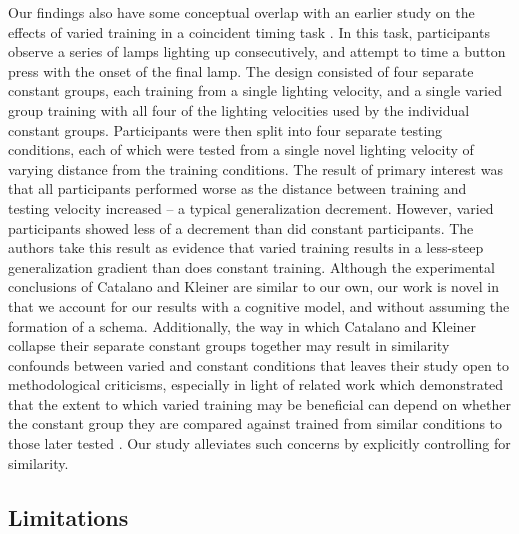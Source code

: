 \documentclass[
  12pt,
  letterpaper,
]{article}
\begin{document}
Our findings also have some conceptual overlap with an earlier study on
the effects of varied training in a coincident timing task
\autocite{catalanoDistantTransferCoincident1984a}. In this task,
participants observe a series of lamps lighting up consecutively, and
attempt to time a button press with the onset of the final lamp. The
design consisted of four separate constant groups, each training from a
single lighting velocity, and a single varied group training with all
four of the lighting velocities used by the individual constant groups.
Participants were then split into four separate testing conditions, each
of which were tested from a single novel lighting velocity of varying
distance from the training conditions. The result of primary interest
was that all participants performed worse as the distance between
training and testing velocity increased -- a typical generalization
decrement. However, varied participants showed less of a decrement than
did constant participants. The authors take this result as evidence that
varied training results in a less-steep generalization gradient than
does constant training. Although the experimental conclusions of
Catalano and Kleiner are similar to our own, our work is novel in that
we account for our results with a cognitive model, and without assuming
the formation of a schema. Additionally, the way in which Catalano and
Kleiner collapse their separate constant groups together may result in
similarity confounds between varied and constant conditions that leaves
their study open to methodological criticisms, especially in light of
related work which demonstrated that the extent to which varied training
may be beneficial can depend on whether the constant group they are
compared against trained from similar conditions to those later tested
\autocite{wrisbergVariabilityPracticeHypothesis1987}. Our study
alleviates such concerns by explicitly controlling for similarity.

\subsection{Limitations}\label{limitations}
\end{document}
